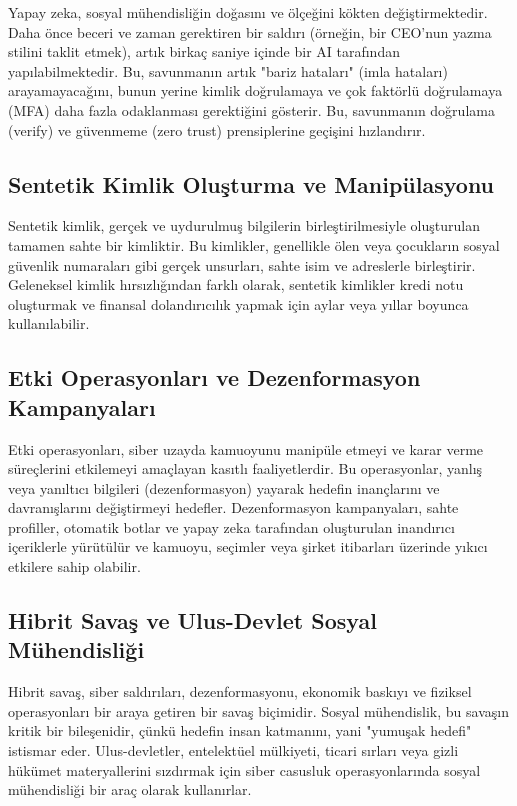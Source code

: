 Yapay zeka, sosyal mühendisliğin doğasını ve ölçeğini kökten değiştirmektedir. Daha önce beceri ve zaman gerektiren bir saldırı (örneğin, bir CEO'nun yazma stilini taklit etmek), artık birkaç saniye içinde bir AI tarafından yapılabilmektedir. Bu, savunmanın artık "bariz hataları" (imla hataları) arayamayacağını, bunun yerine kimlik doğrulamaya ve çok faktörlü doğrulamaya (MFA) daha fazla odaklanması gerektiğini gösterir. Bu, savunmanın doğrulama (verify) ve güvenmeme (zero trust) prensiplerine geçişini hızlandırır.

\subsection{Sentetik Kimlik Oluşturma ve Manipülasyonu}

Sentetik kimlik, gerçek ve uydurulmuş bilgilerin birleştirilmesiyle oluşturulan tamamen sahte bir kimliktir. Bu kimlikler, genellikle ölen veya çocukların sosyal güvenlik numaraları gibi gerçek unsurları, sahte isim ve adreslerle birleştirir. Geleneksel kimlik hırsızlığından farklı olarak, sentetik kimlikler kredi notu oluşturmak ve finansal dolandırıcılık yapmak için aylar veya yıllar boyunca kullanılabilir.

\subsection{Etki Operasyonları ve Dezenformasyon Kampanyaları}

Etki operasyonları, siber uzayda kamuoyunu manipüle etmeyi ve karar verme süreçlerini etkilemeyi amaçlayan kasıtlı faaliyetlerdir. Bu operasyonlar, yanlış veya yanıltıcı bilgileri (dezenformasyon) yayarak hedefin inançlarını ve davranışlarını değiştirmeyi hedefler. Dezenformasyon kampanyaları, sahte profiller, otomatik botlar ve yapay zeka tarafından oluşturulan inandırıcı içeriklerle yürütülür ve kamuoyu, seçimler veya şirket itibarları üzerinde yıkıcı etkilere sahip olabilir.

\subsection{Hibrit Savaş ve Ulus-Devlet Sosyal Mühendisliği}

Hibrit savaş, siber saldırıları, dezenformasyonu, ekonomik baskıyı ve fiziksel operasyonları bir araya getiren bir savaş biçimidir. Sosyal mühendislik, bu savaşın kritik bir bileşenidir, çünkü hedefin insan katmanını, yani "yumuşak hedefi" istismar eder. Ulus-devletler, entelektüel mülkiyeti, ticari sırları veya gizli hükümet materyallerini sızdırmak için siber casusluk operasyonlarında sosyal mühendisliği bir araç olarak kullanırlar.

